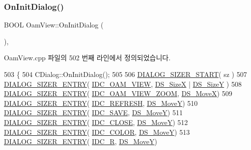 \subsubsection{\texorpdfstring{On\+Init\+Dialog()}{OnInitDialog()}}
{\footnotesize\ttfamily B\+O\+OL Oam\+View\+::\+On\+Init\+Dialog (\begin{DoxyParamCaption}{ }\end{DoxyParamCaption})\hspace{0.3cm}{\ttfamily [protected]}, {\ttfamily [virtual]}}



Oam\+View.\+cpp 파일의 502 번째 라인에서 정의되었습니다.


\begin{DoxyCode}
503 \{
504   CDialog::OnInitDialog();
505   
506   \mbox{\hyperlink{_resize_dlg_8h_acb9d1d22d9838f6dda8a61cfa132997c}{DIALOG\_SIZER\_START}}( sz )
507     \mbox{\hyperlink{_resize_dlg_8h_a0e9ee7a18c54003893895a009f5d79c8}{DIALOG\_SIZER\_ENTRY}}( \mbox{\hyperlink{resource_8h_a9b64c0912aa96e257bf909982c83e5ab}{IDC\_OAM\_VIEW}}, \mbox{\hyperlink{_resize_dlg_8h_a21713fd373c62604a1ee3d5d831101ad}{DS\_SizeX}} | 
      \mbox{\hyperlink{_resize_dlg_8h_a783821ba6bb984916d55f46cdf90cb2b}{DS\_SizeY}} )
508     \mbox{\hyperlink{_resize_dlg_8h_a0e9ee7a18c54003893895a009f5d79c8}{DIALOG\_SIZER\_ENTRY}}( \mbox{\hyperlink{resource_8h_a7e646a067717f74b563429c8b81c7df2}{IDC\_OAM\_VIEW\_ZOOM}}, 
      \mbox{\hyperlink{_resize_dlg_8h_a9f96d817606755d91347bd606825c5af}{DS\_MoveX}})
509     \mbox{\hyperlink{_resize_dlg_8h_a0e9ee7a18c54003893895a009f5d79c8}{DIALOG\_SIZER\_ENTRY}}( \mbox{\hyperlink{resource_8h_ab2f366ad34063a7be9de1e2249dc705a}{IDC\_REFRESH}}, \mbox{\hyperlink{_resize_dlg_8h_ae5309071be822a4dae5cb33a131f6180}{DS\_MoveY}})
510     \mbox{\hyperlink{_resize_dlg_8h_a0e9ee7a18c54003893895a009f5d79c8}{DIALOG\_SIZER\_ENTRY}}( \mbox{\hyperlink{resource_8h_a305f8d6fb810f32b99a97396ac92f9d5}{IDC\_SAVE}},  \mbox{\hyperlink{_resize_dlg_8h_ae5309071be822a4dae5cb33a131f6180}{DS\_MoveY}})
511     \mbox{\hyperlink{_resize_dlg_8h_a0e9ee7a18c54003893895a009f5d79c8}{DIALOG\_SIZER\_ENTRY}}( \mbox{\hyperlink{resource_8h_a27e7224faecfa4040c695a69107088f9}{IDC\_CLOSE}}, \mbox{\hyperlink{_resize_dlg_8h_ae5309071be822a4dae5cb33a131f6180}{DS\_MoveY}})
512     \mbox{\hyperlink{_resize_dlg_8h_a0e9ee7a18c54003893895a009f5d79c8}{DIALOG\_SIZER\_ENTRY}}( \mbox{\hyperlink{resource_8h_a611975b03b6d7ce68b2de260b97086d0}{IDC\_COLOR}}, \mbox{\hyperlink{_resize_dlg_8h_ae5309071be822a4dae5cb33a131f6180}{DS\_MoveY}})
513     \mbox{\hyperlink{_resize_dlg_8h_a0e9ee7a18c54003893895a009f5d79c8}{DIALOG\_SIZER\_ENTRY}}( \mbox{\hyperlink{resource_8h_ab801af70383175ec71fd14d356bf9c9d}{IDC\_R}}, \mbox{\hyperlink{_resize_dlg_8h_ae5309071be822a4dae5cb33a131f6180}{DS\_MoveY}})

\end{DoxyCode}
